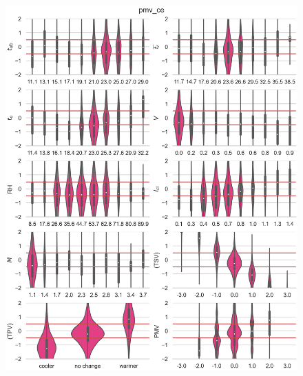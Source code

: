 \begin{figure}[htb!]
    \centering
    \includegraphics[width=\textwidth]{figures/bias_pmv_ce}
    \caption{}
    \label{fig:bias_pmv_ce}
\end{figure}